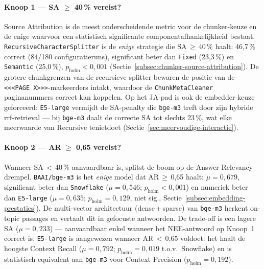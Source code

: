 \paragraph{Knoop 1 — SA $\geq$ 40\,\% vereist?}
Source Attribution is de meest onderscheidende metric voor de chunker-keuze en de enige waarvoor een statistisch significante componentafhankelijkheid bestaat. \texttt{RecursiveCharacterSplitter} is de \emph{enige} strategie die SA\,$\geq$\,40\,\% haalt: 46{,}7\,\% correct (84/180 configuratieruns), significant beter dan \texttt{Fixed} (23{,}3\,\%) en \texttt{Semantic} (25{,}0\,\%), $p_{\text{holm}}{<}0{,}001$ (Sectie~\ref{subsec:chunker-source-attribution}). De grotere chunkgrenzen van de recursieve splitter bewaren de positie van de \texttt{<<<PAGE~X>>>}-markeerders intakt, waardoor de \texttt{ChunkMetaCleaner} paginanummers correct kan koppelen. Op het JA-pad is ook de embedder-keuze geforceerd: \texttt{E5-large} vermijdt de SA-penalty die \texttt{bge-m3} treft door zijn hybride \gls{rrf}-retrieval — bij \texttt{bge-m3} daalt de correcte SA tot slechts 23\,\%, wat elke meerwaarde van Recursive tenietdoet (Sectie~\ref{sec:meervoudige-interactie}).

\paragraph{Knoop 2 — AR $\geq$ 0{,}65 vereist?}
Wanneer SA\,$<$\,40\,\% aanvaardbaar is, splitst de boom op de Answer Relevancy-drempel. \texttt{BAAI/bge-m3} is het \emph{enige} model dat AR\,$\geq$\,0{,}65 haalt: $\mu{=}0{,}679$, significant beter dan \texttt{Snowflake} ($\mu{=}0{,}546$; $p_{\text{holm}}{<}0{,}001$) en numeriek beter dan \texttt{E5-large} ($\mu{=}0{,}635$; $p_{\text{holm}}{=}0{,}129$, niet sig., Sectie~\ref{subsec:embedding-prestaties}). De multi-vector architectuur (dense\,+\,sparse) van \texttt{bge-m3} herkent on-topic passages en vertaalt dit in gefocuste antwoorden. De trade-off is een lagere SA ($\mu{=}0{,}233$) — aanvaardbaar enkel wanneer het NEE-antwoord op Knoop~1 correct is. \texttt{E5-large} is aangewezen wanneer AR\,$<$\,0{,}65 voldoet: het haalt de hoogste Context Recall ($\mu{=}0{,}792$; $p_{\text{holm}}{=}0{,}019$ t.o.v.\ Snowflake) en is statistisch equivalent aan \texttt{bge-m3} voor Context Precision ($p_{\text{holm}}{=}0{,}192$).

